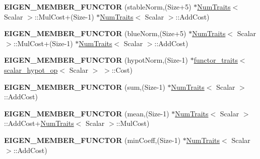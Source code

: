 \begin{DoxyCompactItemize}
{\bfseries E\+I\+G\+E\+N\+\_\+\+M\+E\+M\+B\+E\+R\+\_\+\+F\+U\+N\+C\+T\+OR} (stable\+Norm,(Size+5) $\ast$\hyperlink{group___core___module_struct_eigen_1_1_num_traits}{Num\+Traits}$<$ Scalar $>$\+::Mul\+Cost+(Size-\/1) $\ast$\hyperlink{group___core___module_struct_eigen_1_1_num_traits}{Num\+Traits}$<$ Scalar $>$\+::Add\+Cost)
\item 
\mbox{\label{namespace_eigen_1_1internal_a679d4a1ffba4b41232f135265bfeed29}} 
{\bfseries E\+I\+G\+E\+N\+\_\+\+M\+E\+M\+B\+E\+R\+\_\+\+F\+U\+N\+C\+T\+OR} (blue\+Norm,(Size+5) $\ast$\hyperlink{group___core___module_struct_eigen_1_1_num_traits}{Num\+Traits}$<$ Scalar $>$\+::Mul\+Cost+(Size-\/1) $\ast$\hyperlink{group___core___module_struct_eigen_1_1_num_traits}{Num\+Traits}$<$ Scalar $>$\+::Add\+Cost)
\item 
\mbox{\label{namespace_eigen_1_1internal_a561e210ddabd80c15133261e8f3fee32}} 
{\bfseries E\+I\+G\+E\+N\+\_\+\+M\+E\+M\+B\+E\+R\+\_\+\+F\+U\+N\+C\+T\+OR} (hypot\+Norm,(Size-\/1) $\ast$\hyperlink{struct_eigen_1_1internal_1_1functor__traits}{functor\+\_\+traits}$<$ \hyperlink{struct_eigen_1_1internal_1_1scalar__hypot__op}{scalar\+\_\+hypot\+\_\+op}$<$ Scalar $>$ $>$\+::Cost)
\item 
\mbox{\label{namespace_eigen_1_1internal_a7facfa7241d92132c1cfde113d6774a4}} 
{\bfseries E\+I\+G\+E\+N\+\_\+\+M\+E\+M\+B\+E\+R\+\_\+\+F\+U\+N\+C\+T\+OR} (sum,(Size-\/1) $\ast$\hyperlink{group___core___module_struct_eigen_1_1_num_traits}{Num\+Traits}$<$ Scalar $>$\+::Add\+Cost)
\item 
\mbox{\label{namespace_eigen_1_1internal_aaa428334b11b154759d5032d49fb3187}} 
{\bfseries E\+I\+G\+E\+N\+\_\+\+M\+E\+M\+B\+E\+R\+\_\+\+F\+U\+N\+C\+T\+OR} (mean,(Size-\/1) $\ast$\hyperlink{group___core___module_struct_eigen_1_1_num_traits}{Num\+Traits}$<$ Scalar $>$\+::Add\+Cost+\hyperlink{group___core___module_struct_eigen_1_1_num_traits}{Num\+Traits}$<$ Scalar $>$\+::Mul\+Cost)
\item 
\mbox{\label{namespace_eigen_1_1internal_a0de7f95e5f1fa492a604ce76af2f966d}} 
{\bfseries E\+I\+G\+E\+N\+\_\+\+M\+E\+M\+B\+E\+R\+\_\+\+F\+U\+N\+C\+T\+OR} (min\+Coeff,(Size-\/1) $\ast$\hyperlink{group___core___module_struct_eigen_1_1_num_traits}{Num\+Traits}$<$ Scalar $>$\+::Add\+Cost)

\end{DoxyCompactItemize}
